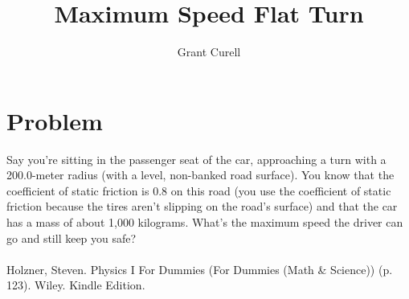 \documentclass{article}
\title{Maximum Speed Flat Turn}
\author{Grant Curell}
\begin{document}
\maketitle{}
\section{Problem}
Say you’re sitting in the passenger seat of the car, approaching a turn with a 200.0-meter radius (with a level, non-banked road surface). You know that the coefficient of static friction is 0.8 on this road (you use the coefficient of static friction because the tires aren’t slipping on the road’s surface) and that the car has a mass of about 1,000 kilograms. What’s the maximum speed the driver can go and still keep you safe?
\\\\
Holzner, Steven. Physics I For Dummies (For Dummies (Math \& Science)) (p. 123). Wiley. Kindle Edition.
\\\\
\end{document}
